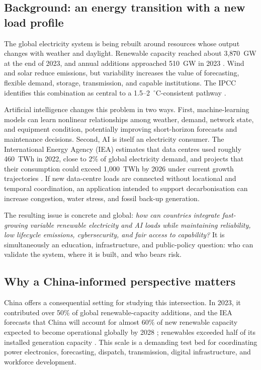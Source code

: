 \documentclass[12pt]{article}
\begin{document}
\subsection{Background: an energy transition with a new load profile}
The global electricity system is being rebuilt around resources whose output changes with weather and daylight. Renewable capacity reached about 3,870~GW at the end of 2023, and annual additions approached 510~GW in 2023 \citep{irena2024,iea2024renewables}. Wind and solar reduce emissions, but variability increases the value of forecasting, flexible demand, storage, transmission, and capable institutions. The IPCC identifies this combination as central to a 1.5--2~$^{\circ}$C-consistent pathway \citep{ipcc2023}.

Artificial intelligence changes this problem in two ways. First, machine-learning models can learn nonlinear relationships among weather, demand, network state, and equipment condition, potentially improving short-horizon forecasts and maintenance decisions. Second, AI is itself an electricity consumer. The International Energy Agency (IEA) estimates that data centres used roughly 460~TWh in 2022, close to 2\% of global electricity demand, and projects that their consumption could exceed 1,000~TWh by 2026 under current growth trajectories \citep{iea2024electricity}. If new data-centre loads are connected without locational and temporal coordination, an application intended to support decarbonisation can increase congestion, water stress, and fossil back-up generation.

The resulting issue is concrete and global: \emph{how can countries integrate fast-growing variable renewable electricity and AI loads while maintaining reliability, low lifecycle emissions, cybersecurity, and fair access to capability?} It is simultaneously an education, infrastructure, and public-policy question: who can validate the system, where it is built, and who bears risk.

\subsection{Why a China-informed perspective matters}
China offers a consequential setting for studying this intersection. In 2023, it contributed over 50\% of global renewable-capacity additions, and the IEA forecasts that China will account for almost 60\% of new renewable capacity expected to become operational globally by 2028 \citep{iea2024renewables}; renewables exceeded half of its installed generation capacity \citep{nea2024}. This scale is a demanding test bed for coordinating power electronics, forecasting, dispatch, transmission, digital infrastructure, and workforce development.
\end{document}
